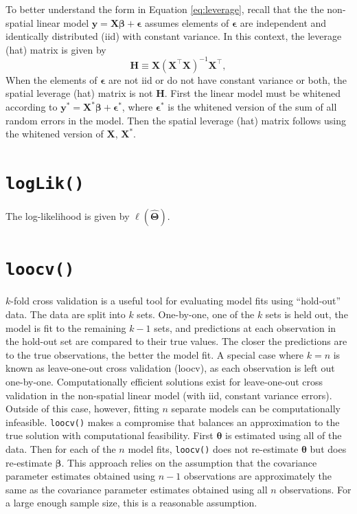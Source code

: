 \documentclass[10pt,letterpaper]{article}
\begin{document}
To better understand the form in Equation \ref{eq:leverage}, recall that
the the non-spatial linear model
\(\mathbf{y} = \mathbf{X} \boldsymbol{\beta} + \boldsymbol{\epsilon}\)
assumes elements of \(\boldsymbol{\epsilon}\) are independent and
identically distributed (iid) with constant variance. In this context,
the leverage (hat) matrix is given by \begin{equation*}
\mathbf{H} \equiv \mathbf{X} (\mathbf{X}^{\top} \mathbf{X})^{-1} \mathbf{X}^{\top},
\end{equation*} When the elements of \(\boldsymbol{\epsilon}\) are not
iid or do not have constant variance or both, the spatial leverage (hat)
matrix is not \(\mathbf{H}\). First the linear model must be whitened
according to
\(\mathbf{y}^* = \mathbf{X}^* \boldsymbol{\beta} + \boldsymbol{\epsilon}^*\),
where \(\boldsymbol{\epsilon}^*\) is the whitened version of the sum of
all random errors in the model. Then the spatial leverage (hat) matrix
follows using the whitened version of \(\mathbf{X}\), \(\mathbf{X}^*\).

\hypertarget{sec:loglik}{%
\section{\texorpdfstring{\texttt{logLik()}}{logLik()}}\label{sec:loglik}}

The log-likelihood is given by \(\ell(\boldsymbol{\hat{\Theta}})\).

\hypertarget{sec:loocv}{%
\section{\texorpdfstring{\texttt{loocv()}}{loocv()}}\label{sec:loocv}}

\(k\)-fold cross validation is a useful tool for evaluating model fits
using ``hold-out'' data. The data are split into \(k\) sets. One-by-one,
one of the \(k\) sets is held out, the model is fit to the remaining
\(k - 1\) sets, and predictions at each observation in the hold-out set
are compared to their true values. The closer the predictions are to the
true observations, the better the model fit. A special case where
\(k = n\) is known as leave-one-out cross validation (loocv), as each
observation is left out one-by-one. Computationally efficient solutions
exist for leave-one-out cross validation in the non-spatial linear model
(with iid, constant variance errors). Outside of this case, however,
fitting \(n\) separate models can be computationally infeasible.
\texttt{loocv()} makes a compromise that balances an approximation to
the true solution with computational feasibility. First
\(\boldsymbol{\theta}\) is estimated using all of the data. Then for
each of the \(n\) model fits, \texttt{loocv()} does not re-estimate
\(\boldsymbol{\theta}\) but does re-estimate \(\boldsymbol{\beta}\).
This approach relies on the assumption that the covariance parameter
estimates obtained using \(n - 1\) observations are approximately the
same as the covariance parameter estimates obtained using all \(n\)
observations. For a large enough sample size, this is a reasonable
assumption.
\end{document}
